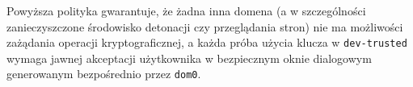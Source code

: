 Powyższa polityka gwarantuje, że żadna inna domena (a w szczególności zanieczyszczone środowisko detonacji czy przeglądania stron) nie ma możliwości zażądania operacji kryptograficznej, a każda próba użycia klucza w \texttt{dev-trusted} wymaga jawnej akceptacji użytkownika w bezpiecznym oknie dialogowym generowanym bezpośrednio przez \texttt{dom0}.
